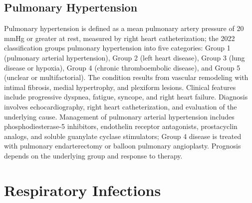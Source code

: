 \subsection{Pulmonary Hypertension}
\label{sec:Pulmonary Hypertension}
Pulmonary hypertension is defined as a mean pulmonary artery pressure of 20 mmHg or greater at rest, measured by right heart catheterization; the 2022 classification groups pulmonary hypertension into five categories: Group 1 (pulmonary arterial hypertension), Group 2 (left heart disease), Group 3 (lung disease or hypoxia), Group 4 (chronic thromboembolic disease), and Group 5 (unclear or multifactorial). The condition results from vascular remodeling with intimal fibrosis, medial hypertrophy, and plexiform lesions. Clinical features include progressive dyspnea, fatigue, syncope, and right heart failure. Diagnosis involves echocardiography, right heart catheterization, and evaluation of the underlying cause. Management of pulmonary arterial hypertension includes phosphodiesterase-5 inhibitors, endothelin receptor antagonists, prostacyclin analogs, and soluble guanylate cyclase stimulators; Group 4 disease is treated with pulmonary endarterectomy or balloon pulmonary angioplasty. Prognosis depends on the underlying group and response to therapy.

\section{Respiratory Infections}








\label{sec:Respiratory Infections}

